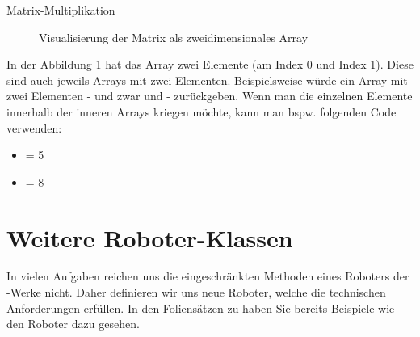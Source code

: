 \documentclass{../tuda-exercise}
\begin{document}
\begin{task}[credit=\stars{2}{3}]{Matrix-Multiplikation}
\begin{solution}
\begin{note}[title=Information:]
        \begin{figure}[H]
          \centering
          \caption{Visualisierung der Matrix als zweidimensionales Array}
          \label{fig:V7_Information}
        \end{figure}

        In der Abbildung \ref{fig:V7_Information} hat das Array zwei Elemente (am Index 0 und
        Index 1). Diese sind auch jeweils Arrays mit zwei Elementen. Beispielsweise würde
         ein Array mit zwei Elementen - und zwar  und
         - zurückgeben. Wenn man die einzelnen Elemente innerhalb der inneren
        Arrays kriegen möchte, kann man bspw. folgenden Code verwenden:

        \begin{itemize}
          \item {} = 5
          \item {} = 8
        \end{itemize}
      \end{note}
    \end{solution}
  \end{task}

  \section*{Weitere Roboter-Klassen}
  In vielen Aufgaben reichen uns die eingeschränkten Methoden eines Roboters der
  -Werke nicht. Daher definieren wir uns neue Roboter, welche die technischen
  Anforderungen erfüllen. In den Foliensätzen zu  haben Sie bereits Beispiele
  wie den  Roboter dazu gesehen.
\end{document}
